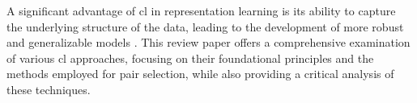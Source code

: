 
A significant advantage of \ac{cl} in representation learning is its ability to capture the underlying structure of the data, 
leading to the development of more robust and generalizable models 
\citet{mochi_2020,PIC_2020,swav_2020,local_aggr_2019,grape_2024,CL_temp_2021}.
This review paper offers a comprehensive examination of various \ac{cl} approaches, 
focusing on their foundational principles and the methods employed for pair selection, 
while also providing a critical analysis of these techniques.